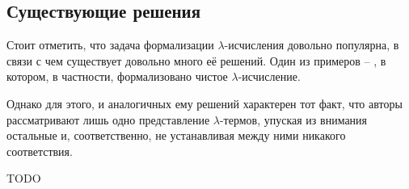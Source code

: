 \subsection{Существующие решения}

Стоит отметить, что задача формализации $\lambda$-исчисления довольно популярна, в связи с чем существует довольно много её решений. Один из примеров -- \cite{lambdaForm}, в котором, в частности, формализовано чистое $\lambda$-исчисление.

Однако для этого, и аналогичных ему решений характерен тот факт, что авторы рассматривают лишь одно представление $\lambda$-термов, упуская из внимания остальные и, соответственно, не устанавливая между ними никакого соответствия.

TODO
